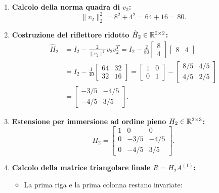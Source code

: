 \begin{example}
\begin{enumerate}
\begin{equation}
    \end{equation}
    \item \textbf{Calcolo della norma quadra di $v_2$:}
    \begin{equation}
        \|v_2\|_2^2 = 8^2 + 4^2 = 64 + 16 = 80.
    \end{equation}
    \item \textbf{Costruzione del riflettore ridotto $\hat{H}_2 \in \mathbb{R}^{2 \times 2}$:}
    \begin{align}
        \hat{H}_2 &= I_2 - \frac{2}{\|v_2\|^2} v_2 v_2^T = I_2 - \frac{2}{80} \begin{bmatrix} 8 \\ 4 \end{bmatrix} \begin{bmatrix} 8 & 4 \end{bmatrix} \nonumber\\
        &= I_2 - \frac{1}{40} \begin{bmatrix} 64 & 32 \\ 32 & 16 \end{bmatrix} = \begin{bmatrix} 1 & 0 \\ 0 & 1 \end{bmatrix} - \begin{bmatrix} 8/5 & 4/5 \\ 4/5 & 2/5 \end{bmatrix} \nonumber\\
        &= \begin{bmatrix} -3/5 & -4/5 \\ -4/5 & 3/5 \end{bmatrix}.
    \end{align}
    \item \textbf{Estensione per immersione ad ordine pieno $H_2 \in \mathbb{R}^{3 \times 3}$:}
    \begin{equation}
        H_2 = \begin{bmatrix} 
        1 & 0 & 0 \\ 
        0 & -3/5 & -4/5 \\ 
        0 & -4/5 & 3/5 
        \end{bmatrix}.
    \end{equation}
    \item \textbf{Calcolo della matrice triangolare finale $R = H_2 A^{(1)}$:}
    \begin{itemize}
        \item La prima riga e la prima colonna restano invariate:
        \begin{equation}

\end{equation}
\end{itemize}
\end{enumerate}
\end{example}
